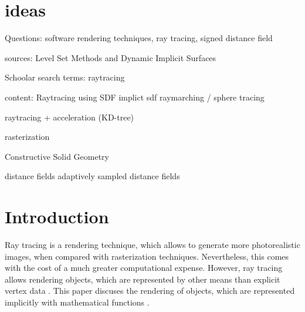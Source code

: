 
\section{ideas}
Questions: software rendering techniques, ray tracing, signed distance field

sources: Level Set Methods and Dynamic Implicit Surfaces

Schoolar search terms: 
raytracing


content:
Raytracing using SDF
implict
sdf
raymarching / sphere tracing

raytracing + acceleration (KD-tree)

rasterization

Constructive Solid Geometry

distance fields
adaptively sampled distance fields

\section{Introduction}
\label{section:Introduction}


Ray tracing is a rendering technique, which allows to generate more photorealistic images, when compared with rasterization techniques. Nevertheless, this comes with the cost of a much greater computational expense. However, ray tracing allows rendering objects, which are represented by other means than explicit vertex data \cite{bungartz:2013:einfuhrung}. This paper discuses the rendering of objects, which are represented implicitly with mathematical functions \cite{osher:2006:level}.  
